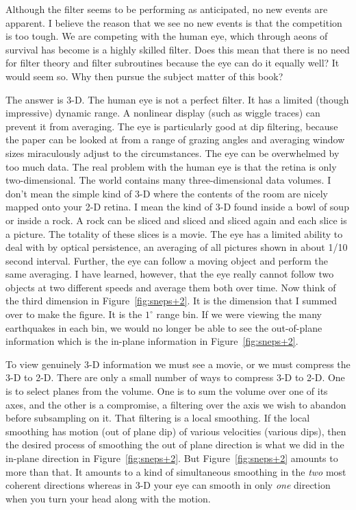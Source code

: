 \par
Although the filter seems to be performing as anticipated,
no new events are apparent.
I believe the reason that we see no new events is
that the competition is too tough.
We are competing with the human eye, which
through aeons of survival has become is a highly skilled filter.
Does this mean that there is no need for filter theory and filter subroutines
because the eye can do it equally well?
It would seem so.
Why then pursue the subject matter of this book?
\par
The answer is 3-D.
The human eye is not a perfect filter.
It has a limited (though impressive) dynamic range.
A nonlinear display (such as wiggle traces)
can prevent it from averaging.
The eye is particularly good at dip filtering,
because the paper can be looked at from a range of grazing angles
and averaging window sizes miraculously adjust to the circumstances.
The eye can be overwhelmed by too much data.
The real problem with the human eye
is that the retina is only two-dimensional.
The world contains many three-dimensional data volumes.
I don't mean the simple kind of 3-D where the contents of the room
are nicely mapped onto your 2-D retina.
I mean the kind of 3-D found inside a bowl of soup or inside a rock.
A rock can be sliced and sliced and sliced again and each slice is a picture.
The totality of these slices is a movie.
The eye has a limited ability to deal with  by optical persistence,
an averaging of all pictures shown in about 1/10 second interval.
Further, the eye can follow a moving object and perform the same
averaging.
I have learned, however, that the eye really cannot follow two objects
at two different speeds and average them both over time.
Now think of the third dimension in Figure~\ref{fig:sneps+2}.
It is the dimension that I summed over to make the figure.
It is the $1^\circ$ range bin.
If we were viewing the many earthquakes in each bin,
we would no longer be able to see the out-of-plane information
which is the in-plane information in Figure~\ref{fig:sneps+2}.

\par
To view genuinely 3-D information we must see a movie,
or we must compress the 3-D to 2-D.
There are only a small number of ways to compress 3-D to 2-D.
One is to select planes from the volume.
One is to sum the volume over one of its axes,
and the other is a compromise,
a filtering over the axis we wish to abandon before subsampling on it.
That filtering is a local smoothing.
If the local smoothing has motion
(out of plane dip) of various velocities (various dips),
then the desired process of smoothing the out of plane direction
is what we did in the in-plane direction
in Figure~\ref{fig:sneps+2}.
But Figure~\ref{fig:sneps+2} amounts to more than that.
It amounts to a kind of simultaneous smoothing in the {\it two}
most coherent directions
whereas in 3-D your eye can smooth in only {\it one} direction
when you turn your head along with the motion.

